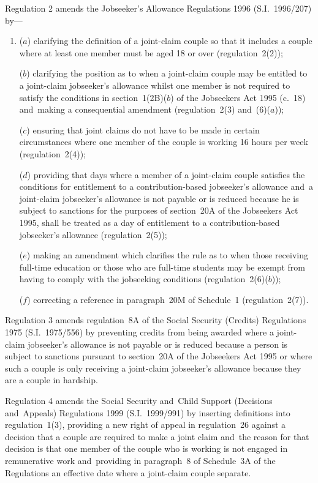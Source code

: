 \documentclass[12pt,a4paper]{article}
\begin{document}
Regulation 2 amends the Jobseeker’s Allowance Regulations 1996 (S.I.~1996/\hspace{0pt}207) by—
\begin{enumerate}\item[]
($a$) clarifying the definition of a joint-claim couple so that it includes a couple where at least one member must be aged 18 or over (regulation~2(2));

($b$) clarifying the position as to when a joint-claim couple may be entitled to a joint-claim jobseeker’s allowance whilst one member is not required to satisfy the conditions in section~1(2B)($b$)  of the Jobseekers Act 1995 (c.~18) and~making a consequential amendment  (regulation~2(3) and~(6)($a$));

($c$) ensuring that joint claims do not have to be made in certain circumstances where one member of the couple is working 16 hours per week (regulation~2(4));

($d$) providing that days where a member of a joint-claim couple satisfies the conditions for entitlement to a contribution-based jobseeker’s allowance and~a joint-claim jobseeker’s allowance is not payable or is reduced because he is subject to sanctions for the purposes of section~20A of the Jobseekers Act 1995, shall be treated as a day of entitlement to a contribution-based jobseeker’s allowance (regulation~2(5));

($e$) making an amendment which clarifies the rule as to when those receiving full-time education or those who are full-time students may be exempt from having to comply with the jobseeking conditions (regulation~2(6)($b$));

($f$) correcting a reference in paragraph~20M of Schedule~1 (regulation~2(7)).
\end{enumerate}

Regulation 3 amends regulation~8A of the Social Security (Credits) Regulations 1975 (S.I.~1975/556) by preventing credits from being awarded where a joint-claim jobseeker’s allowance is not payable or is reduced because a person is subject to sanctions pursuant to section~20A of the Jobseekers Act 1995 or where such a couple is only receiving a joint-claim jobseeker’s allowance because they are a couple in hardship.

Regulation 4 amends the Social Security and~Child Support (Decisions and~Appeals) Regulations 1999 (S.I.~1999/991) by inserting definitions into regulation~1(3), providing a new right of appeal in regulation~26 against a decision that a couple are required to make a joint claim and~the reason for that decision is that one member of the couple who is working is not engaged in remunerative work and~providing in paragraph~8 of Schedule~3A of the Regulations an effective date where a joint-claim couple separate.
\end{document}
